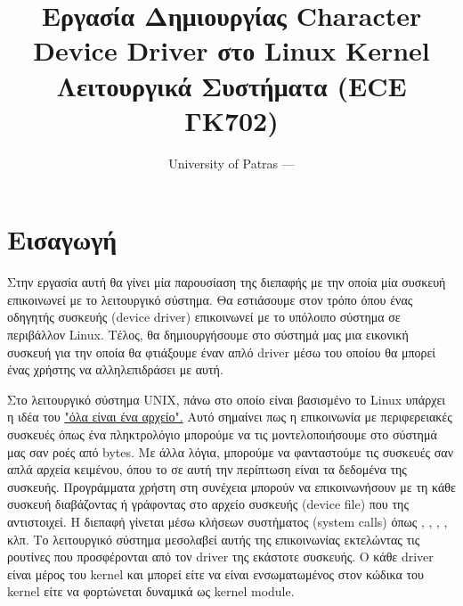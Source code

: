 \documentclass[18pt]{extarticle}
\title{Εργασία Δημιουργίας Character Device Driver στο Linux Kernel \\Λειτουργικά Συστήματα (ECE ΓΚ702)} %
\date{University of Patras --- \the\year{}} %
\begin{document}
\pagestyle{fancy}
\fancyhf{} %
\renewcommand{\headrulewidth}{0pt}
\fancyhead{} %
\fancyfoot{} %
\fancyfoot[R]{\thepage}

\maketitle

\tableofcontents


\section{Εισαγωγή}

Στην εργασία αυτή θα γίνει μία παρουσίαση της διεπαφής με την οποία μία συσκευή επικοινωνεί με το λειτουργικό σύστημα. 
Θα εστιάσουμε στον τρόπο όπου ένας οδηγητής συσκευής (device driver) επικοινωνεί με το υπόλοιπο σύστημα σε περιβάλλον Linux.
Τέλος, θα δημιουργήσουμε στο σύστημά μας μια εικονική συσκευή για την οποία θα φτιάξουμε έναν απλό driver μέσω του οποίου θα μπορεί ένας χρήστης να αλληλεπιδράσει με αυτή.

Στο λειτουργικό σύστημα UNIX, πάνω στο οποίο είναι βασισμένο το Linux υπάρχει η ιδέα του \href{https://en.wikipedia.org/wiki/Everything_is_a_file}{"όλα είναι ένα αρχείο".}
Αυτό σημαίνει πως η επικοινωνία με περιφερειακές συσκευές όπως ένα πληκτρολόγιο μπορούμε να τις μοντελοποιήσουμε στο σύστημά μας σαν ροές από bytes.
Με άλλα λόγια, μπορούμε να φανταστούμε τις συσκευές σαν απλά αρχεία κειμένου, όπου το  σε αυτή την περίπτωση είναι τα δεδομένα της συσκευής.
Προγράμματα χρήστη στη συνέχεια μπορούν να επικοινωνήσουν με τη κάθε συσκευή διαβάζοντας ή γράφοντας στο αρχείο συσκευής (device file) που της αντιστοιχεί.
Η διεπαφή γίνεται μέσω κλήσεων συστήματος (system calls) όπως , , , ,  κλπ.
Το λειτουργικό σύστημα μεσολαβεί αυτής της επικοινωνίας εκτελώντας τις ρουτίνες που προσφέρονται από τον driver της εκάστοτε συσκευής.
Ο κάθε driver είναι μέρος του kernel και μπορεί είτε να είναι ενσωματωμένος στον κώδικα του kernel είτε να φορτώνεται δυναμικά ως kernel module.
\end{document}
